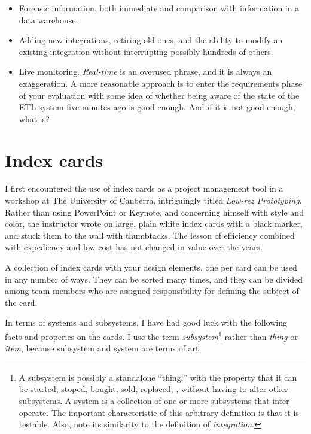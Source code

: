 \documentclass[11pt,letterpaper,twosided]{memoir}
\begin{document}
\begin{description}
\begin{enumerate}
\begin{itemize}
\item Forensic information, both immediate and comparison with
information in a data warehouse.

\item Adding new integrations, retiring old ones, and the ability
to modify an existing integration without interrupting possibly
hundreds of others.

\item Live monitoring. \emph{Real-time} is an overused phrase, and
it is always an exaggeration. A more reasonable approach is to enter
the requirements phase of your evaluation with some idea of whether
being aware of the state of the ETL system five minutes ago is good
enough. And if it is not good enough, what is?

\end{itemize}

\end{enumerate}


\end{description}
\section{Index cards}

I first encountered the use of index cards as a project management
tool in a workshop at The University of Canberra, intriguingly
titled \emph{Low-rez Prototyping}.  Rather than using PowerPoint
or Keynote, and concerning himself with style and color, the
instructor wrote on large, plain white index cards with a black
marker, and stuck them to the wall with thumbtacks. The lesson of
efficiency combined with expediency and low cost has not changed
in value over the years.

A collection of index cards with your design elements, one per card
can be used in any number of ways. They can be sorted many times,
and they can be divided among team members who are assigned
responsibility for defining the subject of the card.

In terms of systems and subsystems, I have had good luck with the
following facts and properies on the cards. I use the term
\emph{subsystem}\footnote{A subsystem is possibly a standalone
``thing,'' with the property that it can be started, stoped, bought,
sold, replaced, \etc, without having to alter other subsystems. A
system is a collection of one or more subsystems that inter-operate.
The important characteristic of this arbitrary definition is that
it is testable. Also, note its similarity to the definition of 
\emph{integration}.} rather than \emph{thing} or \emph{item}, because
subsystem and system are terms of art.
\end{document}
